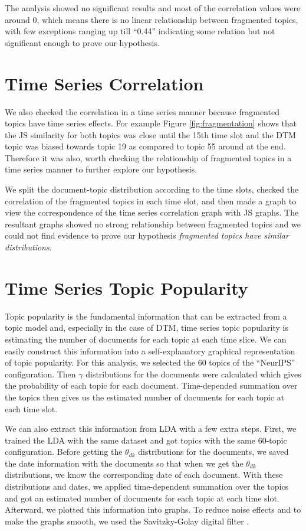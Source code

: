 \documentclass[a4paper]{report}
\begin{document}
The analysis showed no significant results and most of the correlation values were around 0, which means there is no linear relationship between fragmented topics, with few exceptions ranging up till ``0.44'' indicating some relation but not significant enough to prove our hypothesis.

\section{Time Series Correlation}
We also checked the correlation in a time series manner because fragmented topics have time series effects. For example Figure \ref{fig:fragmentation} shows that the JS similarity for both topics was close until the 15th time slot and the DTM topic was biased towards topic 19 as compared to topic 55 around at the end. Therefore it was also, worth checking the relationship of fragmented topics in a time series manner to further explore our hypothesis.

We split the document-topic distribution according to the time slots, checked the correlation of the fragmented topics in each time slot, and then made a graph to view the correspondence of the time series correlation graph with JS graphs. The resultant graphs showed no strong relationship between fragmented topics and we could not find evidence to prove our hypothesis \textit{fragmented topics have similar distributions}.

\section{Time Series Topic Popularity}
Topic popularity is the fundamental information that can be extracted from a topic model and, especially in the case of DTM, time series topic popularity is estimating the number of documents for each topic at each time slice. We can easily construct this information into a self-explanatory graphical representation of topic popularity. For this analysis, we selected the 60 topics of the ``NeurIPS'' configuration. Then $\gamma$ distributions for the documents were calculated which gives the probability of each topic for each document. Time-depended summation over the topics then gives us the estimated number of documents for each topic at each time slot. 

We can also extract this information from LDA with a few extra steps. First, we trained the LDA with the same dataset and got topics with the same 60-topic configuration. Before getting the $\theta_{dk}$ distributions for the documents, we saved the date information with the documents so that when we get the $\theta_{dk}$ distributions, we know the corresponding date of each document. With these distributions and dates, we applied time-dependent summation over the topics and got an estimated number of documents for each topic at each time slot. Afterward, we plotted this information into graphs. To reduce noise effects and to make the graphs smooth, we used the Savitzky-Golay digital filter \cite{william1990sgfilter}.
\end{document}
